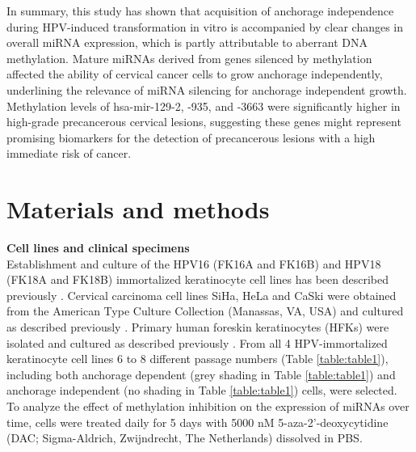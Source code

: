 In summary, this study has shown that acquisition of anchorage independence during HPV-induced transformation in vitro is accompanied by clear changes in overall miRNA expression, which is partly attributable to aberrant DNA methylation. Mature miRNAs derived from genes silenced by methylation affected the ability of cervical cancer cells to grow anchorage independently, underlining the relevance of miRNA silencing for anchorage independent growth.  Methylation levels of hsa-mir-129-2, -935, and -3663 were significantly higher in high-grade precancerous cervical lesions, suggesting these genes might represent promising biomarkers for the detection of precancerous lesions with a high immediate risk of cancer.


\section{Materials and methods}

\textbf{Cell lines and clinical specimens}
\\
Establishment and culture of the HPV16 (FK16A and FK16B) and HPV18 (FK18A and FK18B) immortalized keratinocyte cell lines has been described previously \cite{Steenbergen1996}. Cervical carcinoma cell lines SiHa, HeLa and CaSki were obtained from the American Type Culture Collection (Manassas, VA, USA) and cultured as described previously \cite{Steenbergen2001}. Primary human foreskin keratinocytes (HFKs) were isolated and cultured as described previously \cite{Steenbergen1996}. From all 4 HPV-immortalized keratinocyte cell lines 6 to 8 different passage numbers (Table \ref{table:table1}), including both anchorage dependent (grey shading in Table \ref{table:table1}) and anchorage independent (no shading in Table \ref{table:table1}) cells, were selected. To analyze the effect of methylation inhibition on the expression of miRNAs over time, cells were treated daily for 5 days with 5000 nM 5-aza-2'-deoxycytidine (DAC; Sigma-Aldrich, Zwijndrecht, The Netherlands) dissolved in PBS. 

